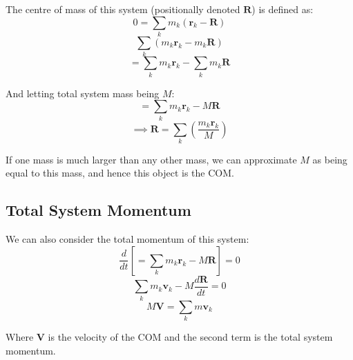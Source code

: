 The centre of mass of this system (positionally denoted $\pmb{R}$) is defined as:
\[
    0 = \sum_k m_k \left(\pmb{r}_k - \pmb{R}\right)
\]
\[
    \sum_k \left(m_k \pmb{r}_k - m_k \pmb{R}\right)
\]
\[
    = \sum_k m_k \pmb{r}_k - \sum_k m_k \pmb{R}
\]

And letting total system mass being $M$:
\[
    = \sum_k m_k \pmb{r}_k - M \pmb{R}
\]
\[
    \implies \pmb{R} = \sum_k \left(\frac{m_k \pmb{r}_k}{M}\right)
\]

If one mass is much larger than any other mass, we can approximate $M$ as being equal to this mass, and hence this object is the COM.

\subsection{Total System Momentum}
We can also consider the total momentum of this system:
\[
    \frac{d}{dt} \left[= \sum_k m_k \pmb{r}_k - M \pmb{R}\right] = 0
\]
\[
    \sum_k m_k \pmb{v}_k - M \frac{d \pmb{R}}{dt} = 0
\]
\[
    M \pmb{V} = \sum_k m \pmb{v}_k
\]

Where $\pmb{V}$ is the velocity of the COM and the second term is the total system momentum.





